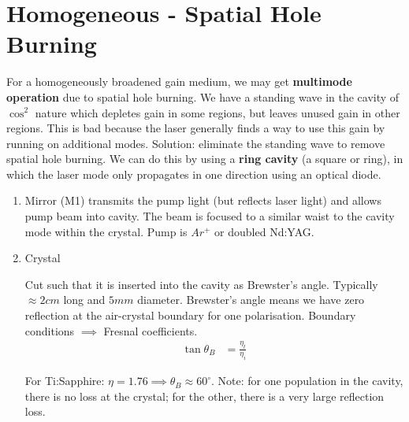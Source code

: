 \documentclass[a4paper, 11pt, normalem]{report}
\begin{document}
\section{Homogeneous - Spatial Hole Burning}
For a homogeneously broadened gain medium, we may get \textbf{multimode operation} due to spatial hole burning.
We have a standing wave in the cavity of $\cos^2$ nature which depletes gain in some regions, but leaves unused gain in other regions.
This is bad because the laser generally finds a way to use this gain by running on additional modes.
Solution: eliminate the standing wave to remove spatial hole burning.
We can do this by using a \textbf{ring cavity} (a square or ring), in which the laser mode only propagates in one direction using an optical diode.
\begin{enumerate}
    \item Mirror (M1) transmits the pump light (but reflects laser light) and allows pump beam into cavity.
        The beam is focused to a similar waist to the cavity mode within the crystal.
        Pump is $Ar^+$ or doubled Nd:YAG.
    \item Crystal
        \begin{multicols}{2}
        \begin{figure}[H]
            \centering
        \end{figure}
        \columnbreak
        Cut such that it is inserted into the cavity as Brewster's angle.
        Typically $\approx2cm$ long and $5mm$ diameter.
        Brewster's angle means we have zero reflection at the air-crystal boundary for one polarisation.
        Boundary conditions $\implies$ Fresnal coefficients.
        \begin{align}
            \tan\theta_B &= \frac{\eta_t}{\eta_i}
        \end{align}
        \end{multicols}
        For Ti:Sapphire: $\eta=1.76\implies\theta_B\approx60^\circ$.
        Note: for one population in the cavity, there is no loss at the crystal; for the other, there is a very large reflection loss.

\end{enumerate}
\end{document}
